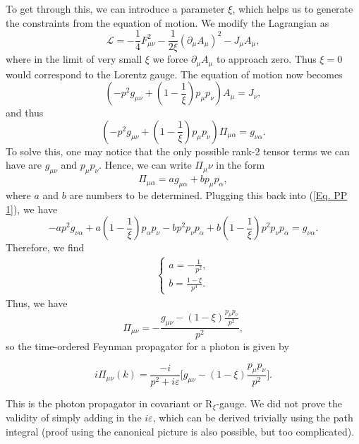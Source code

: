 \documentclass[11pt]{article}
\theoremstyle{definition}
\begin{document}
To get through this, we can introduce a parameter $\xi$, which helps us to generate the constraints from the equation of motion. We modify the Lagrangian as
\begin{equation}
    \mathcal{L} = -\frac{1}{4}F_{\mu\nu}^2 - \frac{1}{2\xi}(\partial_\mu A_\mu)^2 - J_\mu A_\mu,
\end{equation}
where in the limit of very small $\xi$ we force $\partial_\mu A_\mu$ to approach zero. Thus $\xi=0$ would correspond to the Lorentz gauge. The equation of motion now becomes
\begin{equation}
    (-p^2g_{\mu\nu} + (1-\frac{1}{\xi})p_\mu p_\nu)A_\mu = J_\nu,
\end{equation}
and thus 
\begin{equation}
    (-p^2g_{\mu\nu} + (1-\frac{1}{\xi})p_\mu p_\nu)\Pi_{\mu\alpha} = g_{\nu\alpha}.
    \label{Eq. PP 1}
\end{equation}
To solve this, one may notice that the only possible rank-2 tensor terms we can have are $g_{\mu\nu}$ and $p_\mu p_\nu$. Hence, we can write $\Pi_\mu\nu$ in the form
\begin{equation}
    \Pi_{\mu\alpha} = ag_{\mu\alpha} + bp_\mu p_\alpha,
\end{equation}
where $a$ and $b$ are numbers to be determined. Plugging this back into (\ref{Eq. PP 1}), we have
\begin{equation}
    -ap^2g_{\nu\alpha} + a(1-\frac{1}{\xi})p_\alpha p_\nu -bp^2p_\nu p_\alpha + b(1-\frac{1}{\xi})p^2p_\nu p_\alpha = g_{\nu\alpha}.
\end{equation}
Therefore, we find
\begin{equation}
    \begin{aligned}
        \begin{cases}
            a = -\frac{1}{p^2},\\
            b = \frac{1-\xi}{p^4}.
        \end{cases}
    \end{aligned}
\end{equation}
Thus, we have
\begin{equation}
    \Pi_{\mu\nu} = -\frac{g_{\mu\nu} - (1-\xi)\frac{p_\mu p_\nu}{p^2}}{p^2},
\end{equation}
so the time-ordered Feynman propagator for a photon is given by
\begin{shaded}
    \begin{equation}
        i\Pi_{\mu\nu}(k) = \frac{-i}{p^2+i\varepsilon}\biggr[g_{\mu\nu} - (1-\xi)\frac{p_\mu p_\nu}{p^2}\biggl].
    \end{equation}
\end{shaded}
This is the photon propagator in covariant or $\text{R}_\xi$-gauge. We did not prove the validity of simply adding in the $i\varepsilon$, which can be derived trivially using the path integral (proof using the canonical picture is also possible, but too complicated).
\end{document}
